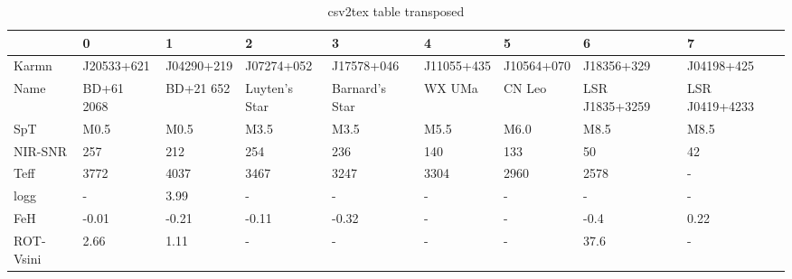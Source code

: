 \begin{table}
\label{}
\caption{csv2tex table transposed}
\begin{tabular}{lllllllll}
\toprule
{} &           0 &           1 &              2 &               3 &           4 &           5 &               6 &               7 \\
\midrule
Karmn     &  J20533+621 &  J04290+219 &     J07274+052 &      J17578+046 &  J11055+435 &  J10564+070 &      J18356+329 &      J04198+425 \\
Name      &  BD+61 2068 &   BD+21 652 &  Luyten's Star &  Barnard's Star &      WX UMa &      CN Leo &  LSR J1835+3259 &  LSR J0419+4233 \\
SpT       &        M0.5 &        M0.5 &           M3.5 &            M3.5 &        M5.5 &        M6.0 &            M8.5 &            M8.5 \\
NIR-SNR   &         257 &         212 &            254 &             236 &         140 &         133 &              50 &              42 \\
Teff      &        3772 &        4037 &           3467 &            3247 &        3304 &        2960 &            2578 &               - \\
logg      &           - &        3.99 &              - &               - &           - &           - &               - &               - \\
FeH       &       -0.01 &       -0.21 &          -0.11 &           -0.32 &           - &           - &            -0.4 &            0.22 \\
ROT-Vsini &        2.66 &        1.11 &              - &               - &           - &           - &            37.6 &               - \\
\bottomrule
\end{tabular}
\end{table}
